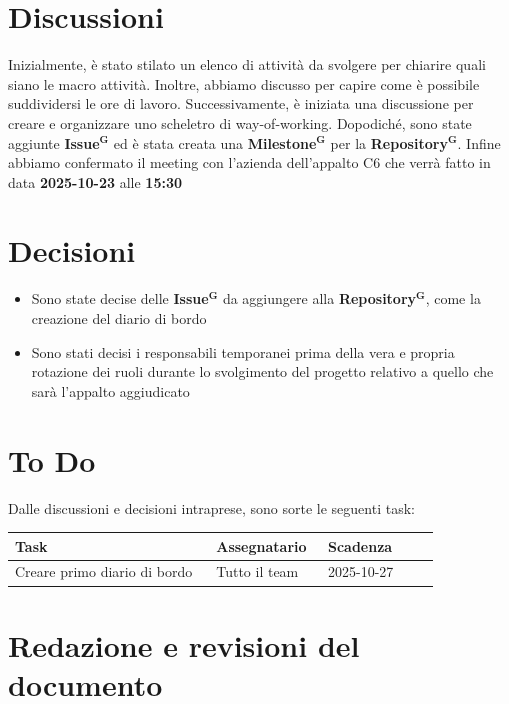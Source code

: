 \documentclass[a4paper,12pt]{article}
\newcommand{\term}[1]{\textbf{#1}$^\mathbf{G}$}
\begin{document}
\section{Discussioni}
Inizialmente, è stato stilato un elenco di attività da svolgere per chiarire quali siano le macro attività. Inoltre, abbiamo discusso per capire come è possibile suddividersi le ore di lavoro. Successivamente, è iniziata una discussione per creare e organizzare uno scheletro di way-of-working.
Dopodiché, sono state aggiunte \term{Issue} ed è stata creata una \term{Milestone} per la \term{Repository}.
Infine abbiamo confermato il meeting con l'azienda dell'appalto C6 che verrà fatto in data \textbf{2025-10-23} alle \textbf{15:30}

\section{Decisioni}
\begin{itemize}
    \item Sono state decise delle \term{Issue} da aggiungere alla \term{Repository}, come la creazione del diario di bordo
    \item Sono stati decisi i responsabili temporanei prima della vera e propria rotazione dei ruoli durante lo svolgimento del progetto relativo a quello che sarà l'appalto aggiudicato
\end{itemize}

\section{To Do}
Dalle discussioni e decisioni intraprese, sono sorte le seguenti task:

\begin{center}
\small
\renewcommand{\arraystretch}{1.2} 
\begin{tabular}{|p{0.45\linewidth}|p{0.25\linewidth}|p{0.25\linewidth}|}
\hline
\rowcolor{gray!60} 
\textbf{Task} & \textbf{Assegnatario} & \textbf{Scadenza} \\
\hline
\rowcolor{white}
Creare primo diario di bordo & Tutto il team & 2025-10-27 \\
\hline
\end{tabular}
\end{center}

\clearpage
\section{Redazione e revisioni del documento}
\end{document}
